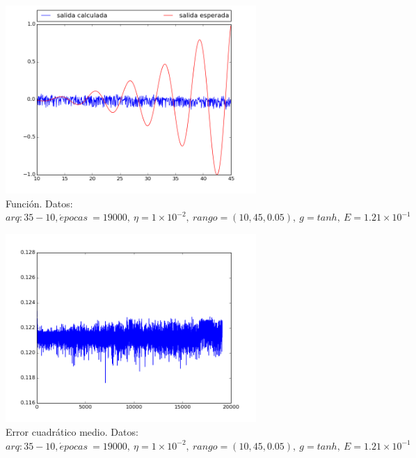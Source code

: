 \documentclass[12pt,a4paper]{article}
\begin{document}
\begin{figure}[H]
\centering
\includegraphics[width=0.85\textwidth]{img/_35_10-eta=001-FUNCTION.png}
\caption{\label{fig:test3} Función. Datos:  $arq: 35-10, \acute{e} pocas \ =19000,\ \eta = 1 \times 10^{-2}, \ rango=(10, 45, 0.05),\ g=tanh, \ E = 1.21 \times 10^{-1}$}
\end{figure}

\begin{figure}[H]
\centering
\includegraphics[width=0.85\textwidth]{img/_35_10-eta=001-ERROR.png}
\caption{\label{fig:test3err} Error cuadrático medio. Datos:  $arq: 35-10, \acute{e} pocas \ =19000,\ \eta = 1 \times 10^{-2}, \ rango=(10, 45, 0.05),\ g=tanh, \ E = 1.21 \times 10^{-1}$}
\end{figure}
\end{document}
